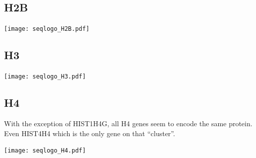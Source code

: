 \documentclass[10pt,a4paper,twocolumn,article]{memoir}
\begin{document}
    \subsection{H2B}
      \begin{TableAndFigure*}
        \label{tab:H2B-consensus}
        

        \texttt{[image: seqlogo\_H2B.pdf]}
        \label{fig:H2B-weblogo}
      \end{TableAndFigure*}

    \subsection{H3}
      \begin{TableAndFigure*}
        \label{tab:H3-consensus}
        

        \texttt{[image: seqlogo\_H3.pdf]}
        \label{fig:H3-weblogo}
      \end{TableAndFigure*}

    \subsection{H4}
      With the exception of HIST1H4G, all H4 genes seem to encode the same protein. Even HIST4H4 which is the
      only gene on that ``cluster''.
      \begin{TableAndFigure*}
        \label{tab:H4-consensus}
        

        \texttt{[image: seqlogo\_H4.pdf]}
        \label{fig:H4-weblogo}
      \end{TableAndFigure*}


\end{document}
